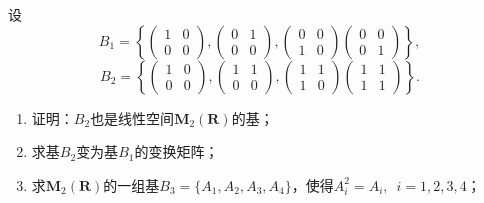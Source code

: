 \begin{exercise}
\begin{exgroup}
        \item 设
        \[B_1=\left\{\begin{pmatrix}
                1 & 0 \\ 0 & 0
            \end{pmatrix},\begin{pmatrix}
                0 & 1 \\ 0 & 0
            \end{pmatrix},\begin{pmatrix}
                0 & 0 \\ 1 & 0
            \end{pmatrix}\begin{pmatrix}
                0 & 0 \\ 0 & 1
            \end{pmatrix}\right\},\]
        \[B_2=\left\{\begin{pmatrix}
                1 & 0 \\ 0 & 0
            \end{pmatrix},\begin{pmatrix}
                1 & 1 \\ 0 & 0
            \end{pmatrix},\begin{pmatrix}
                1 & 1 \\ 1 & 0
            \end{pmatrix}\begin{pmatrix}
                1 & 1 \\ 1 & 1
            \end{pmatrix}\right\}.\]
        \begin{enumerate}
            \item 证明：$B_2$也是线性空间$\mathbf{M}_2(\mathbf{R})$的基；

            \item 求基$B_2$变为基$B_1$的变换矩阵；

            \item 求$\mathbf{M}_2(\mathbf{R})$的一组基$B_3=\{A_1,A_2,A_3,A_4\}$，使得$A_i^2=A_i,\enspace i=1,2,3,4$；


\end{enumerate}
\end{exgroup}
\end{exercise}
